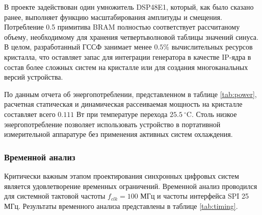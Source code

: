 \documentclass[12pt,a4paper,TimesNewRoman]{article}
\begin{document}
В проекте задействован один умножитель DSP48E1, который, как было сказано ранее, выполняет функцию масштабирования амплитуды и смещения. Потребление 0.5 примитива BRAM полностью соответствует рассчитаному объему, необходимому для хранения четвертьволновой таблицы значений синуса. В целом, разработанный ГССФ занимает менее $0.5\%$ вычислительных ресурсов кристалла, что оставляет запас для интеграции генератора в качестве IP-ядра в состав более сложных систем на кристалле или для создания многоканальных версий устройства.

По данным отчета об энергопотреблении, представленном в таблице \ref{tab:power}, расчетная статическая и динамическая рассеиваемая мощность на кристалле составляет всего $0.111$ Вт при температуре перехода $25.5\ ^\circ\text{C}$. Столь низкое энергопотребление позволяет использовать устройство в портативной измерительной аппаратуре без применения активных систем охлаждения.

\begin{table}[htpb]
    \centering
    \caption{Результаты анализа энергопотребления в среде Xilinx Vivado}
    \label{tab:power}
\end{table}

\subsubsection{Временной анализ}

Критически важным этапом проектирования синхронных цифровых систем является удовлетворение временных ограничений. Временной анализ проводился для системной тактовой частоты $f_{clk} = 100$ МГц и частоты интерфейса SPI 25 МГц. Результаты временного анализа представлены в таблице \ref{tab:timing}.

\begin{table}[htpb]
    \centering
    \caption{Результаты временного анализа в среде Xilinx Vivado}
    \label{tab:timing}
\end{table}
\end{document}
